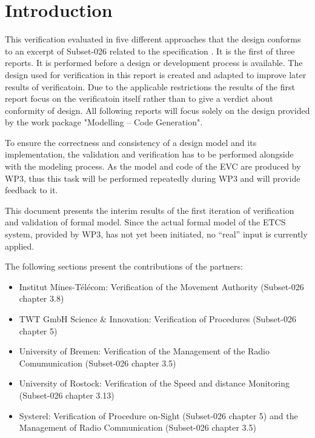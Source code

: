 \documentclass{template/openetcs_article}
\begin{document}



\section{Introduction}
This verification evaluated in five different approaches that the design conforms to an excerpt of Subset-026 \cite{unisig_subset-026_2012}  related to the specification \cite{tsi-2012-88-eu} \cite{tsi-2012-696-eu}.  It is the first of three reports. It is performed before a design or development process is available. The design used for verification in this report is created and adapted to improve later results of verificatoin. Due to the applicable restrictions the results of the first report focus on the verificatoin itself rather than to give a verdict about conformity of design. All following reports will focus solely on the design provided by the work package "Modelling – Code Generation".

To ensure the correctness and consistency of a design model and its implementation, the
validation and verification has to be performed alongside with the modeling process. 
As the model and code of the EVC are produced by WP3,
thus this task will be performed repeatedly during WP3 and will provide
feedback to it.

This document presents the interim results of the first iteration of
verification and validation of formal model.
Since the actual formal model of the ETCS system, provided by WP3, has not
yet been initiated, no ``real'' input is currently applied.

The following sections present the contributions of the partners: 
\begin{itemize}
  \item Institut Mines-Télécom: Verification of the Movement Authority (Subset-026~\cite{unisig_subset-026_2012} chapter 3.8)
  \item TWT GmbH Science \& Innovation: Verification of Procedures (Subset-026 chapter 5)
  \item University of Bremen: Verification of the Management of the Radio
  Comumunication (Subset-026 chapter 3.5)
  \item University of Rostock: Verification of the Speed and distance  Monitoring  (Subset-026 chapter 3.13)
  \item Systerel: Verification of Procedure on-Sight (Subset-026 chapter 5) and the Management of Radio Communication (Subset-026 chapter 3.5)
\end{itemize}
\end{document}
